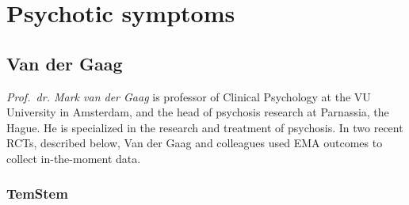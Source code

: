 \documentclass[]{book}
\begin{document}
\section{Psychotic symptoms}\label{psychotic-symptoms}

\subsection{Van der Gaag}\label{van-der-gaag}

 

\emph{Prof.~dr. Mark van der Gaag} is professor of Clinical Psychology
at the VU University in Amsterdam, and the head of psychosis research at
Parnassia, the Hague. He is specialized in the research and treatment of
psychosis. In two recent RCTs, described below, Van der Gaag and
colleagues used EMA outcomes to collect in-the-moment data.

\subsubsection{TemStem}\label{temstem}

\end{document}
